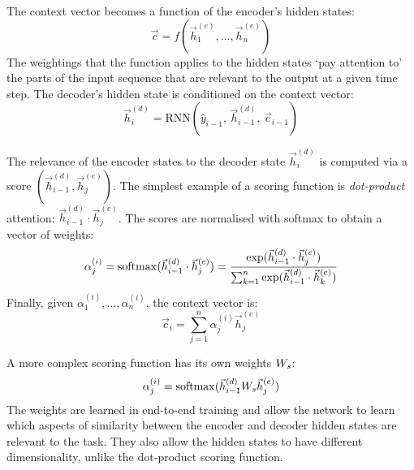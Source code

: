 The context vector becomes a function of the encoder's hidden states:
\begin{equation}
  \vec{c} = f(\vec{h}^{(e)}_1, \dots, \vec{h}^{(e)}_n)
\end{equation}
The weightings that the function applies to the hidden states `pay attention to'
the parts of the input sequence that are relevant to the output at a given time
step.
The decoder's hidden state is conditioned on the context vector:
\begin{equation}
  \vec{h}^{(d)}_i = \text{RNN}(\hat{y}_{i - 1},\, \vec{h}^{(d)}_{i - 1},\, \vec{c}_{i - 1})
\end{equation}

The relevance of the encoder states to the decoder state $\vec{h}^{(d)}_i$ is
computed via a score $(\vec{h}^{(d)}_{i - 1}, \vec{h}^{(e)}_j)$.
The simplest example of a scoring function is \textit{dot-product} attention:
$\vec{h}^{(d)}_{i - 1} \cdot \vec{h}^{(e)}_j$.
The scores are normalised with softmax to obtain a vector of weights:
\begin{equation}
  \alpha^{(i)}_j
  = \operatorname{softmax}(\vec{h}^{(d)}_{i - 1} \cdot \vec{h}^{(e)}_j)
  = \frac{\exp(\vec{h}^{(d)}_{i - 1} \cdot \vec{h}^{(e)}_j)}{\sum_{k = 1}^n \exp(\vec{h}^{(d)}_{i - 1} \cdot \vec{h}^{(e)}_k)}
\end{equation}
Finally, given $\alpha^{(i)}_1, \dots, \alpha^{(i)}_n$, the context vector is:
\begin{equation}
  \vec{c}_i = \sum_{j = 1}^n \alpha^{(i)}_j \vec{h}^{(e)}_j
\end{equation}

A more complex scoring function has its own weights $W_{s}$:
\begin{equation}
  \alpha^{(i)}_j = \operatorname{softmax}(\vec{h}^{(d)}_{i - 1} W_{s} \vec{h}^{(e)}_j)
\end{equation}
The weights are learned in end-to-end training and allow the network to learn
which aspects of similarity between the encoder and decoder hidden states are
relevant to the task.
They also allow the hidden states to have different dimensionality, unlike the
dot-product scoring function.